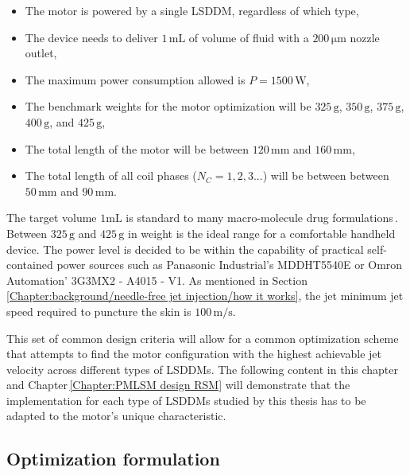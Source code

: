         
        \begin{itemize}
            \item The motor is powered by a single \acs{LSDDM}, regardless of which type,
            \item The device needs to deliver $1\,\mathrm{mL}$ of volume of fluid with a $200\,\mathrm{\mu m}$ nozzle outlet,
            \item The maximum power consumption allowed is $P=1500\,\mathrm{W}$,
            \item The benchmark weights for the motor optimization will be $325\,\mathrm{g}$, $350\,\mathrm{g}$, $375\,\mathrm{g}$, $400\,\mathrm{g}$, and $425\,\mathrm{g}$,
            \item The total length of the motor will be between $120\,\mathrm{mm}$ and $160\,\mathrm{mm}$,
            \item The total length of all coil phases ($N_C=1,2,3...$) will be between between $50\,\mathrm{mm}$ and $90\,\mathrm{mm}$.
        \end{itemize}
        
        
        The target volume $1\mathrm{mL}$ is standard to many macro-molecule drug formulations\,\cite{Hogan2015a}. Between $325\,\mathrm{g}$ and $425\,\mathrm{g}$ in weight is the ideal range for a comfortable handheld device. The power level is decided to be within the capability of practical self-contained power sources such as Panasonic Industrial's MDDHT5540E or Omron Automation' 3G3MX2 - A4015 - V1. As mentioned in Section\,\ref{Chapter:background/needle-free jet injection/how it works}, the jet minimum jet speed required to puncture the skin is $100\,\mathrm{m/s}$. 
        
        
        This set of common design criteria will allow for a common optimization scheme that attempts to find the motor configuration with the highest achievable jet velocity across different types of \acsp{LSDDM}. The following content in this chapter and Chapter\,\ref{Chapter:PMLSM design RSM} will demonstrate that the implementation for each type of \acsp{LSDDM} studied by this thesis has to be adapted to the motor's unique characteristic.
        

    \subsection{Optimization formulation}       \label{Chapter:PMLSM design HM/design optimization/optimization formulation}
    
